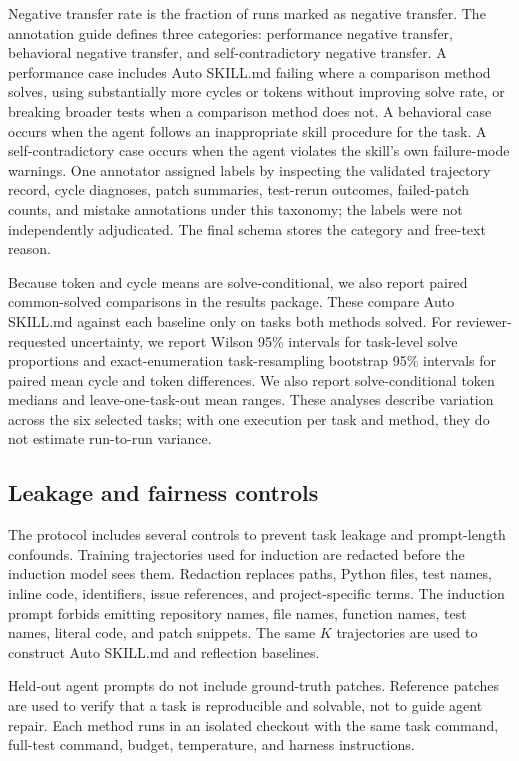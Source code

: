 Negative transfer rate is the fraction of runs marked as negative transfer. The annotation guide defines three categories: performance negative transfer, behavioral negative transfer, and self-contradictory negative transfer. A performance case includes Auto SKILL.md failing where a comparison method solves, using substantially more cycles or tokens without improving solve rate, or breaking broader tests when a comparison method does not. A behavioral case occurs when the agent follows an inappropriate skill procedure for the task. A self-contradictory case occurs when the agent violates the skill's own failure-mode warnings. One annotator assigned labels by inspecting the validated trajectory record, cycle diagnoses, patch summaries, test-rerun outcomes, failed-patch counts, and mistake annotations under this taxonomy; the labels were not independently adjudicated. The final schema stores the category and free-text reason.

Because token and cycle means are solve-conditional, we also report paired common-solved comparisons in the results package. These compare Auto SKILL.md against each baseline only on tasks both methods solved. For reviewer-requested uncertainty, we report Wilson 95\% intervals for task-level solve proportions and exact-enumeration task-resampling bootstrap 95\% intervals for paired mean cycle and token differences. We also report solve-conditional token medians and leave-one-task-out mean ranges. These analyses describe variation across the six selected tasks; with one execution per task and method, they do not estimate run-to-run variance.

\subsection{Leakage and fairness controls}
\label{sec:method_fairness}

The protocol includes several controls to prevent task leakage and prompt-length confounds. Training trajectories used for induction are redacted before the induction model sees them. Redaction replaces paths, Python files, test names, inline code, identifiers, issue references, and project-specific terms. The induction prompt forbids emitting repository names, file names, function names, test names, literal code, and patch snippets. The same $K$ trajectories are used to construct Auto SKILL.md and reflection baselines.

Held-out agent prompts do not include ground-truth patches. Reference patches are used to verify that a task is reproducible and solvable, not to guide agent repair. Each method runs in an isolated checkout with the same task command, full-test command, budget, temperature, and harness instructions.

